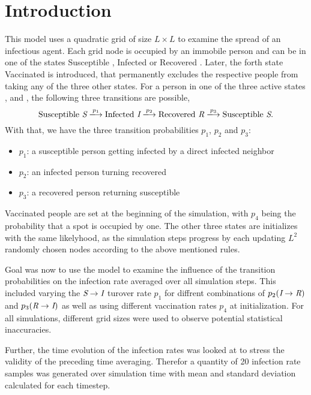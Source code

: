 \section{Introduction}


This model uses a quadratic grid of size $L\times L$ to examine the spread of an infectious agent. Each grid node is occupied by an immobile person and can be in one of the states
Susceptible \susceptible{}, Infected \infected{} or Recovered \recovered{}. Later, the forth state Vaccinated \vaccinated{} is introduced, that permanently excludes the respective people from taking any of the three other states. 
For a person in one of the three active states \susceptible{}, \infected{} and \recovered{}, the following three transitions are possible,
\begin{equation*}
    \mathrm{Susceptible}~\susceptible\xlongrightarrow{p_1}\mathrm{Infected}~\infected{}\xlongrightarrow{p_2}\mathrm{Recovered}~\recovered{}\xlongrightarrow{p_3}\mathrm{Susceptible}~\susceptible{}.
\end{equation*}
With that, we have the three transition probabilities $p_1$, $p_2$ and $p_3$:
\begin{itemize}
    \item $p_1$: a susceptible person getting infected by a direct infected neighbor
    \item $p_2$: an infected person turning recovered
    \item $p_3$: a recovered person returning susceptible
\end{itemize}
Vaccinated people \vaccinated{} are set at the beginning of the simulation, with $p_4$ being the probability that a spot is occupied by one. The other three states are initializes with the same likelyhood, as the 
simulation steps progress by each updating $L^2$ randomly chosen nodes according to the above mentioned rules.

Goal was now to use the model to examine the influence of the transition probabilities on the infection rate averaged over all simulation steps. This included varying the $\textit{S}\rightarrow\textit{I}$ turover rate $p_1$
for diffrent combinations of $p_2(\textit{I}\rightarrow\textit{R})$ and $p_3(\textit{R}\rightarrow\textit{I})$ as well as using different vaccination rates $p_4$ at initialization. For all simulations, different grid sizes
were used to observe potential statistical inaccuracies.

Further, the time evolution of the infection rates was looked at to stress the validity of the preceding time averaging. Therefor a quantity of 20 infection rate samples was generated over simulation time
with mean and standard deviation calculated for each timestep.